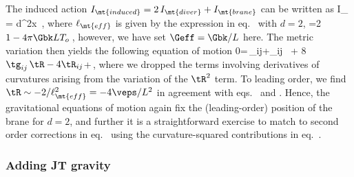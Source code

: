 The induced action $I_\mt{induced} = 2\,I_\mt{diver} + I_\mt{brane}$ can be written as
\beq\label{induct}
I_ = \int d^2x \,,
\eeq
where $\ell_\mt{eff}$ is given by the expression in eq.~ with $d=2$, \ie
\beq\label{lobster}
=2\( 1-4 \pi \Gbk L T_o\)\,,
\eeq
however, we have set $\Geff =  \Gbk/L$ here. The metric variation then yields the following equation of motion
\beq\label{gamble3}
0=\,_{ij}+_{ij} \,
 + 8\,\tR\(\tg_{ij}\,\tR-4 \tR_{ij}\)+\cdots\,,
\eeq
where we dropped the terms involving derivatives of curvatures arising from the variation of the $\tR^2$ term.
To leading order, we find $\tR\sim -2/\ell_\mt{eff}^2 = -4\veps/L^2$ in agreement with eqs.~ and . Hence, the gravitational equations of motion again fix the (leading-order) position of the brane for $d=2$, and further it is a straightforward exercise to match to second order corrections in eq.~ using the curvature-squared contributions in eq.~.


\subsubsection*{Adding JT gravity}

